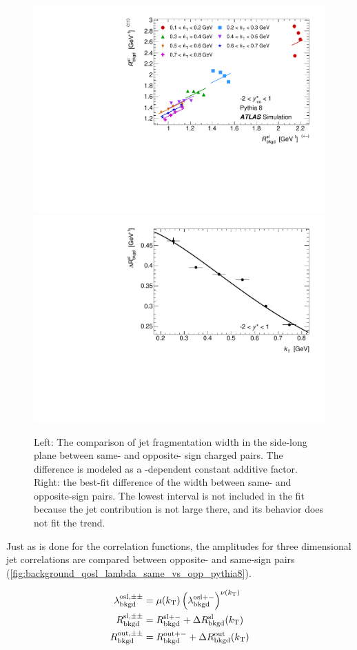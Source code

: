 \begin{figure}[t]
\begin{minipage}[t]{1.0\textwidth}
\centering
\includegraphics[width=.55\linewidth]{can_kt_qosl_backR.pdf}
\includegraphics[width=.44\linewidth]{can_kt_qosl_backR_intercept.pdf}
\end{minipage}
\caption{
  Left: The comparison of jet fragmentation width in the side-long plane between same- and opposite- sign charged pairs. The difference is modeled as a \kt-dependent constant additive factor. Right: the best-fit difference of the width between same- and opposite-sign pairs. The lowest \kt interval is not included in the fit because the jet contribution is not large there, and its behavior does not fit the trend.
}
\label{fig:background_qosl_R_same_vs_opp_pythia8}
\end{figure}


Just as is done for the \qinv correlation functions, the amplitudes for three dimensional jet correlations are compared between opposite- and same-sign pairs (\cref{fig:background_qosl_lambda_same_vs_opp_pythia8}).

\begin{align}
\lambda_{\mathrm{bkgd}}^{\mathrm{osl},\pm\pm} &= \mu(k_\mathrm{T}) \left(\lambda_{\mathrm{bkgd}}^{\mathrm{osl}+-}\right)^{\nu(k_\mathrm{T})} \label{eqn:lambdaBackParOSL}\\
R_{\mathrm{bkgd}}^{\mathrm{sl},\pm\pm} &= R_{\mathrm{bkgd}}^{\mathrm{sl}+-} + \Delta R_{\mathrm{bkgd}}^{\mathrm{sl}}(k_\mathrm{T}) \label{eqn:rBackParSL}\\
R_{\mathrm{bkgd}}^{\mathrm{out},\pm\pm} &= R_{\mathrm{bkgd}}^{\mathrm{out}+-} + \Delta R_{\mathrm{bkgd}}^{\mathrm{out}}(k_\mathrm{T}) \label{eqn:rBackParOut}
\end{align}

